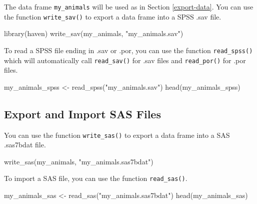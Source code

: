 \documentclass[
]{book}
\newenvironment{Shaded}{\begin{snugshade}}{\end{snugshade}}
\newcommand{\FunctionTok}[1]{\textcolor[rgb]{0.00,0.00,0.00}{#1}}
\newcommand{\NormalTok}[1]{#1}
\newcommand{\OtherTok}[1]{\textcolor[rgb]{0.56,0.35,0.01}{#1}}
\newcommand{\StringTok}[1]{\textcolor[rgb]{0.31,0.60,0.02}{#1}}
\begin{document}
The data frame \texttt{my\_animals} will be used as in Section \ref{export-data}. You can use the function \texttt{write\_sav()} to export a data frame into a SPSS .sav file.

\begin{Shaded}
\begin{Highlighting}[]
\FunctionTok{library}\NormalTok{(haven)}
\FunctionTok{write\_sav}\NormalTok{(my\_animals, }\StringTok{"my\_animals.sav"}\NormalTok{)}
\end{Highlighting}
\end{Shaded}

To read a SPSS file ending in .sav or .por, you can use the function \texttt{read\_spss()} which will automatically call \texttt{read\_sav()} for .sav files and \texttt{read\_por()} for .por files.

\begin{Shaded}
\begin{Highlighting}[]
\NormalTok{my\_animals\_spss }\OtherTok{\textless{}{-}} \FunctionTok{read\_spss}\NormalTok{(}\StringTok{"my\_animals.sav"}\NormalTok{)}
\FunctionTok{head}\NormalTok{(my\_animals\_spss)}
\end{Highlighting}
\end{Shaded}

\hypertarget{export-and-import-sas-files}{%
\subsection{Export and Import SAS Files}\label{export-and-import-sas-files}}

You can use the function \texttt{write\_sas()} to export a data frame into a SAS .sas7bdat file.

\begin{Shaded}
\begin{Highlighting}[]
\FunctionTok{write\_sas}\NormalTok{(my\_animals, }\StringTok{"my\_animals.sas7bdat"}\NormalTok{)}
\end{Highlighting}
\end{Shaded}

To import a SAS file, you can use the function \texttt{read\_sas()}.

\begin{Shaded}
\begin{Highlighting}[]
\NormalTok{my\_animals\_sas }\OtherTok{\textless{}{-}} \FunctionTok{read\_sas}\NormalTok{(}\StringTok{"my\_animals.sas7bdat"}\NormalTok{)}
\FunctionTok{head}\NormalTok{(my\_animals\_sas)}
\end{Highlighting}
\end{Shaded}
\end{document}
